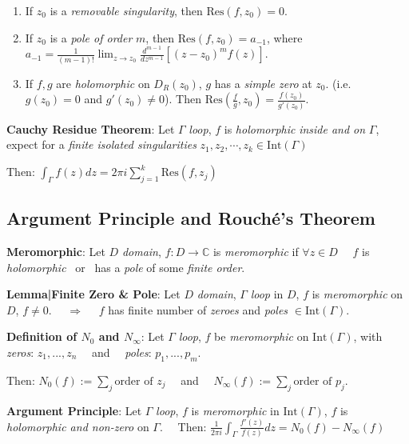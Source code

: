 \documentclass[9pt]{article}
\begin{document}
\begin{enumerate}[itemsep=-2pt, topsep=-2pt]
    \item If $z_0$ is a \textit{removable singularity}, then $\text{Res}(f,z_0)=0$.
    \item If $z_0$ is a \textit{pole of order} $m$, then $\text{Res}(f,z_0)=a_{-1}$, where $a_{-1}=\frac{1}{(m-1)!}\lim_{z\to z_0}\frac{d^{m-1}}{dz^{m-1}}\left[(z-z_0)^mf(z)\right]$.
    \item If $f,g$ are \textit{holomorphic} on $D_{R}(z_0)$, $g$ has a \textit{simple zero} at $z_0$. {\scriptsize (i.e. $g(z_0)=0$ and $g'(z_0)\ne 0$)}. Then $\text{Res}\left(\frac{f}{g},z_0\right)=\frac{f(z_0)}{g'(z_0)}$.
\end{enumerate}

\newpage

\textbf{Cauchy Residue Theorem}: Let $\Gamma$ \textit{loop}, $f$ is \textit{holomorphic} \textit{inside and on} $\Gamma$, expect for a \textit{finite isolated singularities} $z_1,z_2,\cdots,z_k\in\text{Int}(\Gamma)$

\quad Then: $\int_{\Gamma}f(z)dz=2\pi i\sum^k_{j=1}\text{Res}(f,z_j)$ 


\subsection{Argument Principle and Rouché's Theorem} %

\textbf{Meromorphic}: Let $D$ \textit{domain}, $f:D\to\mathbb{C}$ is \textit{meromorphic} if $\forall z\in D$ \ \ $f$ is \textit{holomorphic} \ or \ has a \textit{pole} of some \textit{finite order}.

\quad \textbf{Lemma|Finite Zero \& Pole}: {\small Let $D$ \textit{domain}, $\Gamma$ \textit{loop} in $D$, $f$ is \textit{meromorphic} on $D$, $f\ne0$. \ \ $\Rightarrow$ \ \ $f$ has finite number of \textit{zeroes} and \textit{poles} $\in\text{Int}(\Gamma)$.}

\textbf{Definition of $N_0$ and $N_\infty$}: Let $\Gamma$ \textit{loop}, $f$ be \textit{meromorphic} on $\text{Int}(\Gamma)$, with \quad \textit{zeros}: $z_1,...,z_n$ \ \ and \ \ \textit{poles}: $p_1,...,p_m$.

\quad Then: $N_0(f):=\sum_j\text{order of }z_j$ \ \ and \ \ $N_\infty(f):=\sum_j\text{order of }p_j$.

\textbf{Argument Principle}: {\small Let $\Gamma$ \textit{loop}, $f$ is \textit{meromorphic} in $\text{Int}(\Gamma)$, $f$ is \textit{holomorphic and non-zero} on $\Gamma$. \ \ Then: $\frac{1}{2\pi i}\int_{\Gamma}\frac{f'(z)}{f(z)}dz=N_0(f)-N_\infty(f)$}
\end{document}
